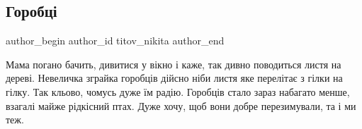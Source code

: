  
 
 
 
 
 
\subsection{Горобці}
\label{sec:17_12_2022.fb.titov_nikita.1.gorobci}
 
\ifcmt
 author_begin
   author_id titov_nikita
 author_end
\fi


Мама погано бачить, дивитися у вікно і каже, так дивно поводиться
листя на дереві. Невеличка зграйка горобців дійсно ніби листя яке
перелітає з гілки на гілку. Так кльово, чомусь дуже їм радію.
Горобців стало зараз набагато менше, взагалі майже рідкісний
птах. Дуже хочу, щоб вони добре перезимували, та і ми теж.

